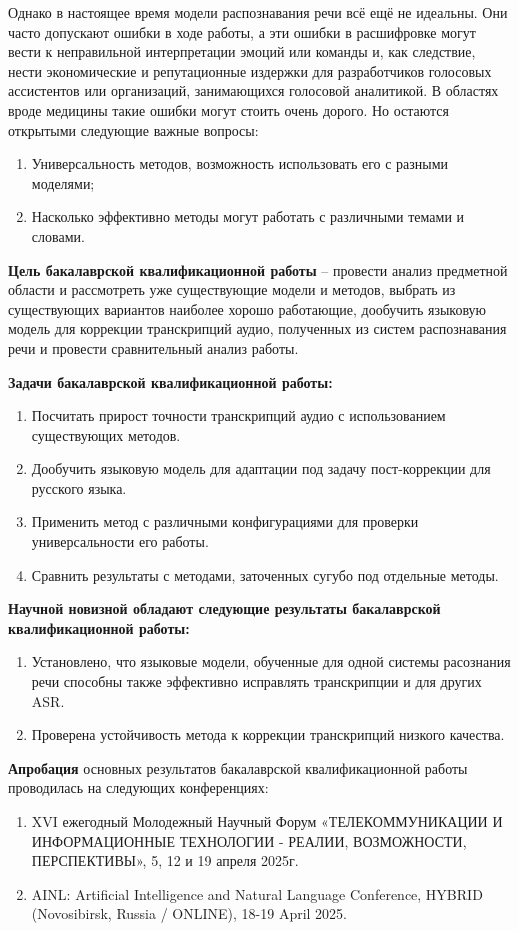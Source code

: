 Однако в настоящее время модели распознавания речи всё ещё не идеальны.
Они часто допускают ошибки в ходе работы, а эти ошибки в расшифровке могут вести к неправильной интерпретации эмоций или команды и, как следствие, нести экономические и репутационные издержки для разработчиков голосовых ассистентов или организаций, занимающихся голосовой аналитикой.
В областях вроде медицины такие ошибки могут стоить очень дорого.
Но остаются открытыми следующие важные вопросы:
\begin{enumerate}
\item Универсальность методов, возможность использовать его с разными моделями;
\item Насколько эффективно методы могут работать с различными темами и словами.
\end{enumerate}

\newpage

\textbf{Цель бакалаврской квалификационной работы} -- провести анализ предметной области и рассмотреть уже существующие модели и методов, выбрать из существующих вариантов наиболее хорошо работающие, дообучить языковую модель для коррекции транскрипций аудио, полученных из систем распознавания речи и провести сравнительный анализ работы.

\textbf{Задачи бакалаврской квалификационной работы:}
\begin{enumerate}
\item Посчитать прирост точности транскрипций аудио с использованием существующих методов. 
\item Дообучить языковую модель для адаптации под задачу пост-коррекции для русского языка.
\item Применить метод с различными конфигурациями для проверки универсальности его работы. 
\item Сравнить результаты с методами, заточенных сугубо под отдельные методы.
\end{enumerate}


\textbf{Научной новизной обладают следующие результаты бакалаврской
  квалификационной работы:}
\begin{enumerate}
\item Установлено, что языковые модели, обученные для одной системы расознания речи способны также эффективно исправлять транскрипции и для других ASR.
\item Проверена устойчивость метода к коррекции транскрипций низкого качества.
\end{enumerate}


\textbf{Апробация} основных результатов бакалаврской квалификационной работы проводилась на следующих конференциях:
\begin{enumerate}
  \item XVI ежегодный Молодежный Научный Форум «ТЕЛЕКОММУНИКАЦИИ И ИНФОРМАЦИОННЫЕ ТЕХНОЛОГИИ - РЕАЛИИ, ВОЗМОЖНОСТИ, ПЕРСПЕКТИВЫ», 5, 12 и 19 апреля 2025г.
  \item AINL: Artificial Intelligence and Natural Language Conference, HYBRID (Novosibirsk, Russia / ONLINE), 18-19 April 2025.
\end{enumerate}
